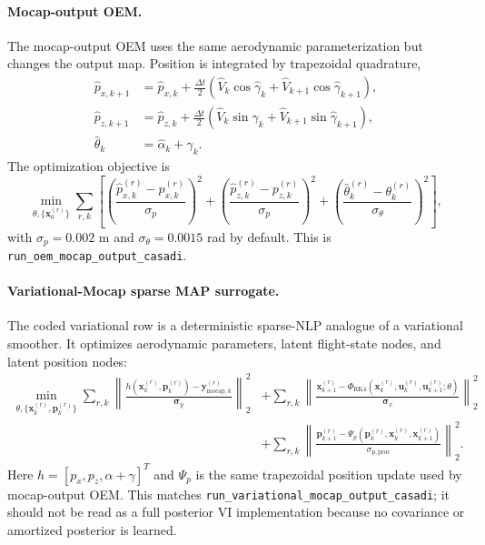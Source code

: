 \documentclass[11pt]{article}
\begin{document}
\paragraph{Mocap-output OEM.}
The mocap-output OEM uses the same aerodynamic parameterization but changes the
output map. Position is integrated by trapezoidal quadrature,
\begin{align}
    \hat{p}_{x,k+1}
        &= \hat{p}_{x,k}
        +\frac{\Delta t}{2}
        (\hat{V}_k\cos\hat{\gamma}_k
        +\hat{V}_{k+1}\cos\hat{\gamma}_{k+1}),\\
    \hat{p}_{z,k+1}
        &= \hat{p}_{z,k}
        +\frac{\Delta t}{2}
        (\hat{V}_k\sin\hat{\gamma}_k
        +\hat{V}_{k+1}\sin\hat{\gamma}_{k+1}),\\
    \hat{\theta}_k &= \hat{\alpha}_k+\hat{\gamma}_k.
\end{align}
The optimization objective is
\begin{equation}
    \min_{\theta,\{\mathbf{x}_0^{(r)}\}}
    \sum_{r,k}
    \left[
    \left(\frac{\hat{p}_{x,k}^{(r)}-p_{x,k}^{(r)}}{\sigma_p}\right)^2
    +\left(\frac{\hat{p}_{z,k}^{(r)}-p_{z,k}^{(r)}}{\sigma_p}\right)^2
    +\left(\frac{\hat{\theta}_{k}^{(r)}-\theta_{k}^{(r)}}{\sigma_\theta}\right)^2
    \right],
    \label{eq:code_oem_mocap}
\end{equation}
with $\sigma_p=0.002$ m and $\sigma_\theta=0.0015$ rad by default. This is
\texttt{run\_oem\_mocap\_output\_casadi}.

\paragraph{Variational-Mocap sparse MAP surrogate.}
The coded variational row is a deterministic sparse-NLP analogue of a
variational smoother. It optimizes aerodynamic parameters, latent flight-state
nodes, and latent position nodes:
\begin{align}
    \min_{\theta,\{\mathbf{x}_k^{(r)},\mathbf{p}_k^{(r)}\}}
    \sum_{r,k}
    \left\|\frac{h(\mathbf{x}_k^{(r)},\mathbf{p}_k^{(r)})
    -\mathbf{y}_{\mathrm{mocap},k}^{(r)}}{\boldsymbol{\sigma}_y}\right\|_2^2
    &+
    \sum_{r,k}
    \left\|\frac{\mathbf{x}_{k+1}^{(r)}
    -\Phi_{\mathrm{RK4}}(\mathbf{x}_{k}^{(r)},\mathbf{u}_{k}^{(r)},\mathbf{u}_{k+1}^{(r)};\theta)}
    {\boldsymbol{\sigma}_x}\right\|_2^2 \nonumber\\
    &+
    \sum_{r,k}
    \left\|\frac{\mathbf{p}_{k+1}^{(r)}
    -\Psi_p(\mathbf{p}_{k}^{(r)},\mathbf{x}_{k}^{(r)},\mathbf{x}_{k+1}^{(r)})}
    {\sigma_{p,\mathrm{proc}}}\right\|_2^2 .
    \label{eq:code_variational_mocap}
\end{align}
Here $h=[p_x,p_z,\alpha+\gamma]^T$ and $\Psi_p$ is the same trapezoidal
position update used by mocap-output OEM. This matches
\texttt{run\_variational\_mocap\_output\_casadi}; it should not be read as a
full posterior VI implementation because no covariance or amortized posterior
is learned.
\end{document}

